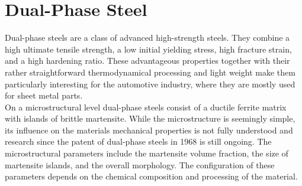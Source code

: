\chapter{Dual-Phase Steel}
\label{cha:DualPhaseSteels}

Dual-phase steels are a class of advanced high-strength steels. They combine a high ultimate tensile strength, a low initial yielding stress, high fracture strain, and a high hardening ratio. These advantageous properties together with their rather straightforward thermodynamical processing and light weight make them particularly interesting for the automotive industry, where they are mostly used for sheet metal parts. \\



On a microstructural level dual-phase steels consist of a ductile ferrite matrix with islands of brittle martensite. While the microstructure is seemingly simple, its influence on the materials mechanical properties is not fully understood and research since the patent of dual-phase steels in 1968 \cite{dualphassteel} is still ongoing. The microstructural parameters include the martensite volume fraction, the size of martensite islands, and the overall morphology. The configuration of these parameters depends on the chemical composition and processing of the material. 


